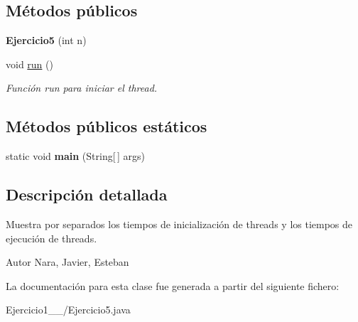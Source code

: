 \subsection*{Métodos públicos}
\begin{DoxyCompactItemize}
\item 
\hypertarget{class_ejercicio1__2__5_1_1_ejercicio5_abd78f61f5410b32ef7ef1b531ea5eba7}{}{\bfseries Ejercicio5} (int n)\label{class_ejercicio1__2__5_1_1_ejercicio5_abd78f61f5410b32ef7ef1b531ea5eba7}

\item 
\hypertarget{class_ejercicio1__2__5_1_1_ejercicio5_ac2367ec1d72ad7cf755d846760af3d03}{}void \hyperlink{class_ejercicio1__2__5_1_1_ejercicio5_ac2367ec1d72ad7cf755d846760af3d03}{run} ()\label{class_ejercicio1__2__5_1_1_ejercicio5_ac2367ec1d72ad7cf755d846760af3d03}

\begin{DoxyCompactList}\small\item\em Función run para iniciar el thread. \end{DoxyCompactList}\end{DoxyCompactItemize}
\subsection*{Métodos públicos estáticos}
\begin{DoxyCompactItemize}
\item 
\hypertarget{class_ejercicio1__2__5_1_1_ejercicio5_a099d2cc93afcd8d311ef14064cf68a53}{}static void {\bfseries main} (String\mbox{[}$\,$\mbox{]} args)\label{class_ejercicio1__2__5_1_1_ejercicio5_a099d2cc93afcd8d311ef14064cf68a53}

\end{DoxyCompactItemize}


\subsection{Descripción detallada}
Muestra por separados los tiempos de inicialización de threads y los tiempos de ejecución de threads. 

\begin{DoxyAuthor}{Autor}
Nara, Javier, Esteban 
\end{DoxyAuthor}


La documentación para esta clase fue generada a partir del siguiente fichero\+:\begin{DoxyCompactItemize}
\item 
Ejercicio1\+\_\+\_/Ejercicio5.\+java\end{DoxyCompactItemize}
